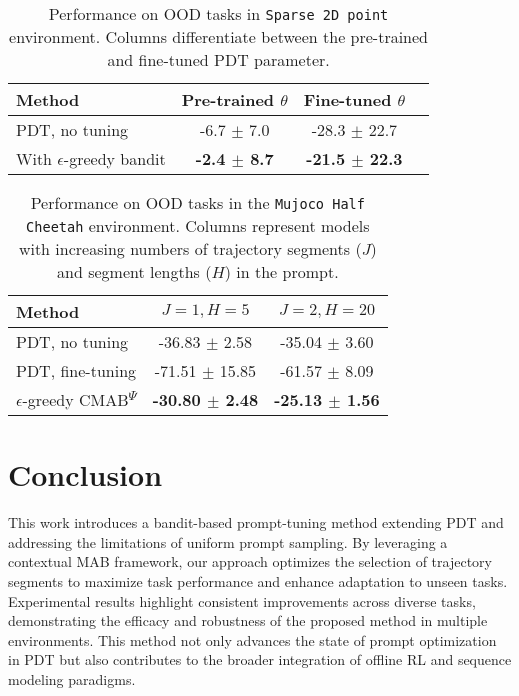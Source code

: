\documentclass{article} %
\begin{document}
\begin{table}[]
\centering
\begin{tabular}{lccc}
Method & Pre-trained $\theta$ & Fine-tuned $\theta$ \\
\hline
PDT, no tuning & -6.7 $\pm$ 7.0 & -28.3 $\pm$ 22.7 \\
With $\epsilon$-greedy bandit & \textbf{-2.4 $\pm$ 8.7} & \textbf{-21.5 $\pm$ 22.3} \\
\hline
\end{tabular}
\caption{Performance on OOD tasks in \texttt{Sparse 2D point} environment. Columns differentiate between the pre-trained and fine-tuned PDT parameter.}\label{tab:2d-ood-finetuning-generalization}
\end{table}

\begin{table}[]
\centering
\begin{tabular}{lcc}
Method & $J=1, H=5$ & $J=2, H=20$ \\
\hline
PDT, no tuning & -36.83 $\pm$ 2.58 & -35.04 $\pm$ 3.60\\
PDT, fine-tuning & -71.51 $\pm$ 15.85 &  -61.57 $\pm$ 8.09 \\
$\epsilon$-greedy CMAB\textsuperscript{$\Psi$} & \textbf{-30.80 $\pm$ 2.48} & \textbf{-25.13 $\pm$ 1.56}\\
\hline
\end{tabular}
\caption{Performance on OOD tasks in the \texttt{Mujoco Half Cheetah} environment. Columns represent models with increasing numbers of trajectory segments ($J$) and segment lengths ($H$) in the prompt.}
\label{tab:half-cheetah-results-ood}
\end{table}


\section{Conclusion}
\label{sec:conclusion}
This work introduces a bandit-based prompt-tuning method extending PDT and addressing the limitations of uniform prompt sampling. By leveraging a contextual MAB framework, our approach optimizes the selection of trajectory segments to maximize task performance and enhance adaptation to unseen tasks. Experimental results highlight consistent improvements across diverse tasks, demonstrating the efficacy and robustness of the proposed method in multiple environments. 
This method not only advances the state of prompt optimization in PDT but also contributes to the broader integration of offline RL and sequence modeling paradigms.
\end{document}
